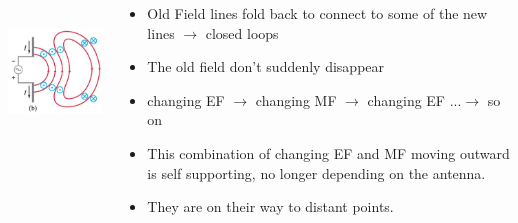 \documentclass[]{beamer}
\begin{document}
\begin{frame}


   \begin{columns}[c]
   \column{2in}  %
  
  \begin{center}
  \includegraphics[height=1.7in]{images5/antenna3.jpg}
\end{center}


   \column{2.7in}


\begin{itemize}
\pause
\item Old Field lines fold back to connect to some of the new lines $\rightarrow$ closed loops
\pause
 \item The old field don't suddenly disappear
\pause
 \item changing EF $\rightarrow$ changing MF $\rightarrow$ changing EF ...$\rightarrow$ so on
\pause
 \item This combination of  changing EF and MF moving outward is self supporting, no longer depending on the antenna. 
\pause
 \item They are on their way to distant points.

\end{itemize}

   \end{columns}


  \end{frame}

\end{document}
